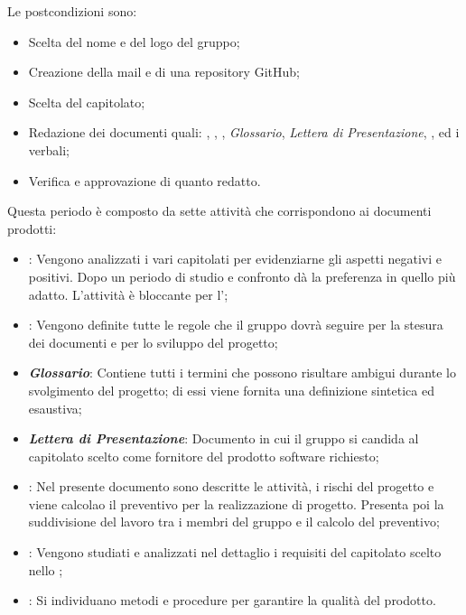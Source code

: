 Le postcondizioni sono:
\begin{itemize}
    \item Scelta del nome e del logo del gruppo;
    \item Creazione della mail e di una repository GitHub;
    \item Scelta del capitolato;
    \item Redazione dei documenti quali: \textit{\SdF}, \textit{\NdP}, \textit{\PdP}, \textit{Glossario}, \textit{Lettera di Presentazione}, \textit{\PdQ}, \textit{\AdR} ed i verbali;
    \item Verifica e approvazione di quanto redatto.
\end{itemize}
Questa periodo è composto da sette attività che corrispondono ai documenti prodotti:
\begin{itemize}
    \item \textbf{\textit{\SdF}}: Vengono analizzati i vari capitolati per evidenziarne gli aspetti
negativi e positivi. Dopo un periodo di studio e confronto {\Gruppo} dà la preferenza in quello più adatto. L'attività è bloccante per l'\textit{\AdR};

    \item \textbf{\textit{\NdP}}: Vengono definite tutte le regole che il gruppo {\Gruppo} dovrà seguire per la stesura dei documenti e per lo sviluppo del progetto;

    \item \textbf{\textit{Glossario}}: Contiene tutti i termini che possono risultare ambigui durante lo svolgimento del progetto; di essi viene fornita una definizione sintetica ed esaustiva;

    \item \textbf{\textit{Lettera di Presentazione}}: Documento in cui il gruppo {\Gruppo} si candida al capitolato scelto come fornitore del prodotto software richiesto;

    \item \textbf{\textit{\PdP}}: Nel presente documento sono descritte le attività, i rischi del progetto e viene calcolao il preventivo per la realizzazione di progetto. Presenta poi la suddivisione del lavoro tra i membri del gruppo {\Gruppo} e il calcolo del preventivo;

    \item \textbf{\textit{\AdR}}: Vengono studiati e analizzati nel dettaglio i requisiti del capitolato scelto nello \textit{\SdF};

    \item \textbf{\textit{\PdQ}}: Si individuano metodi e procedure per garantire la qualità del prodotto.
\end{itemize}
